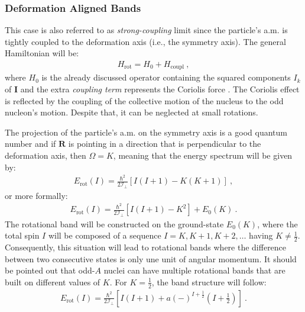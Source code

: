 \subsubsection{Deformation Aligned Bands}

This case is also referred to as \emph{strong-coupling} limit \cite{bohr1953collective} since the particle's a.m. is tightly coupled to the deformation axis (i.e., the symmetry axis). The general Hamiltonian will be:
\begin{align}
    H_\text{rot}=H_0+H_\text{coupl}\ ,
\end{align}
where $H_0$ is the already discussed operator containing the squared components $I_k$ of $\mathbf{I}$ and the extra \emph{coupling term} represents the Coriolis force \cite{bertulani2007nuclear}. The Coriolis effect is reflected by the coupling of the collective motion of the nucleus to the odd nucleon's motion. Despite that, it can be neglected at small rotations.

The projection of the particle's a.m. on the symmetry axis is a good quantum number and if $\mathbf{R}$ is pointing in a direction that is perpendicular to the deformation axis, then $\Omega=K$, meaning that the energy spectrum will be given by:
\begin{align}
    E_\text{rot}(I)=\frac{\hbar^2}{2\mathcal{I}_\perp}\left[I(I+1)-K(K+1)\right]\ ,
\end{align}
or more formally:
\begin{align}
    E_\text{rot}(I)=\frac{\hbar^2}{2\mathcal{I}_\perp}\left[I(I+1)-K^2\right]+E_0(K)\ .
\end{align}
The rotational band will be constructed on the ground-state $E_0(K)$, where the total spin $I$ will be composed of a sequence $I=K,K+1,K+2,\dots$ having $K\neq\frac{1}{2}$. Consequently, this situation will lead to rotational bands where the difference between two consecutive states is only une unit of angular momentum. It should be pointed out that odd-$A$ nuclei can have multiple rotational bands that are built on different values of $K$. For $K=\frac{1}{2}$, the band structure will follow:
\begin{align}
    E_\text{rot}(I)=\frac{\hbar^2}{2\mathcal{I}_\perp}\left[I(I+1)+a(-)^{I+\frac{1}{2}}(I+\frac{1}{2})\right]\ .
    \label{deformation-aligned-energy}
\end{align}


